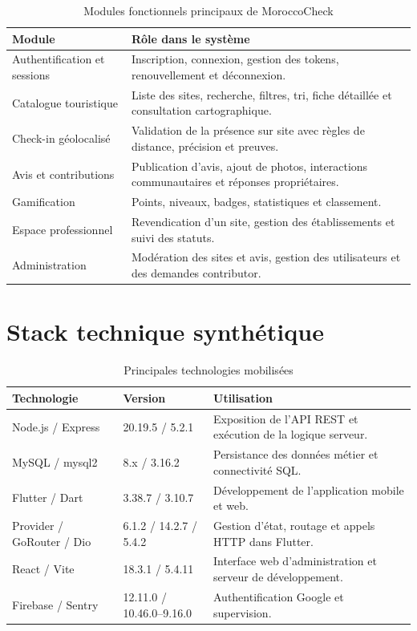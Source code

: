﻿\documentclass[12pt,a4paper]{report}
\begin{document}
\begin{table}[H]
\centering
\caption{Modules fonctionnels principaux de MoroccoCheck}
\begin{tabularx}{\textwidth}{p{4cm}Y}
\toprule
\textbf{Module} & \textbf{R\^ole dans le syst\`eme} \\
\midrule
Authentification et sessions & Inscription, connexion, gestion des tokens, renouvellement et d\'econnexion. \\
Catalogue touristique & Liste des sites, recherche, filtres, tri, fiche d\'etaill\'ee et consultation cartographique. \\
Check-in g\'eolocalis\'e & Validation de la pr\'esence sur site avec r\`egles de distance, pr\'ecision et preuves. \\
Avis et contributions & Publication d'avis, ajout de photos, interactions communautaires et r\'eponses propri\'etaires. \\
Gamification & Points, niveaux, badges, statistiques et classement. \\
Espace professionnel & Revendication d'un site, gestion des \'etablissements et suivi des statuts. \\
Administration & Mod\'eration des sites et avis, gestion des utilisateurs et des demandes contributor. \\
\bottomrule
\end{tabularx}
\end{table}

\section{Stack technique synth\'etique}
\begin{table}[H]
\centering
\caption{Principales technologies mobilis\'ees}
\begin{tabularx}{\textwidth}{p{4cm}p{3cm}Y}
\toprule
\textbf{Technologie} & \textbf{Version} & \textbf{Utilisation} \\
\midrule
Node.js / Express & 20.19.5 / 5.2.1 & Exposition de l'API REST et ex\'ecution de la logique serveur. \\
MySQL / mysql2 & 8.x / 3.16.2 & Persistance des donn\'ees m\'etier et connectivit\'e SQL. \\
Flutter / Dart & 3.38.7 / 3.10.7 & D\'eveloppement de l'application mobile et web. \\
Provider / GoRouter / Dio & 6.1.2 / 14.2.7 / 5.4.2 & Gestion d'\'etat, routage et appels HTTP dans Flutter. \\
React / Vite & 18.3.1 / 5.4.11 & Interface web d'administration et serveur de d\'eveloppement. \\
Firebase / Sentry & 12.11.0 / 10.46.0--9.16.0 & Authentification Google et supervision. \\
\bottomrule
\end{tabularx}
\end{table}
\end{document}
